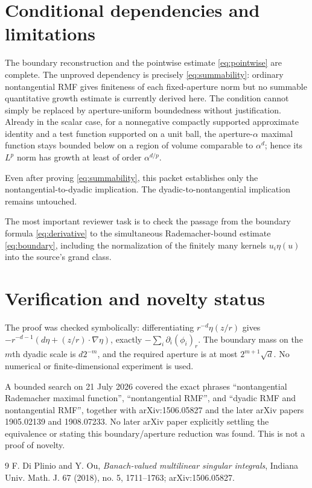 \documentclass[11pt]{article}
\begin{document}
\section{Conditional dependencies and limitations}

The boundary reconstruction and the pointwise estimate
\eqref{eq:pointwise} are complete.  The unproved dependency is precisely
\eqref{eq:summability}: ordinary nontangential RMF gives finiteness of each
fixed-aperture norm but no summable quantitative growth estimate is currently
derived here.  The condition cannot simply be replaced by aperture-uniform
boundedness without justification.  Already in the scalar case, for a
nonnegative compactly supported approximate identity and a test function
supported on a unit ball, the aperture-$\alpha$ maximal function stays bounded
below on a region of volume comparable to $\alpha^d$; hence its $L^p$ norm
has growth at least of order $\alpha^{d/p}$.

Even after proving \eqref{eq:summability}, this packet establishes only the
nontangential-to-dyadic implication.  The dyadic-to-nontangential implication
remains untouched.

The most important reviewer task is to check the passage from the boundary
formula \eqref{eq:derivative} to the simultaneous Rademacher-bound estimate
\eqref{eq:boundary}, including the normalization of the finitely many kernels
$u_i\eta(u)$ into the source's grand class.

\section{Verification and novelty status}

The proof was checked symbolically: differentiating
$r^{-d}\eta(z/r)$ gives
$-r^{-d-1}(d\eta+(z/r)\cdot\nabla\eta)$, exactly
$-\sum_i\partial_i(\phi_i)_r$.  The boundary mass on the $m$th dyadic scale
is $d2^{-m}$, and the required aperture is at most
$2^{m+1}\sqrt d$.  No numerical or finite-dimensional experiment is used.

A bounded search on 21 July 2026 covered the exact phrases
``nontangential Rademacher maximal function'', ``nontangential RMF'', and
``dyadic RMF and nontangential RMF'', together with arXiv:1506.05827 and the
later arXiv papers 1905.02139 and 1908.07233.  No later arXiv paper explicitly
settling the equivalence or stating this boundary/aperture reduction was
found.  This is not a proof of novelty.

\begin{thebibliography}{9}
F. Di Plinio and Y. Ou,
\emph{Banach-valued multilinear singular integrals},
Indiana Univ. Math. J. 67 (2018), no. 5, 1711--1763;
arXiv:1506.05827.
\end{thebibliography}
\end{document}
